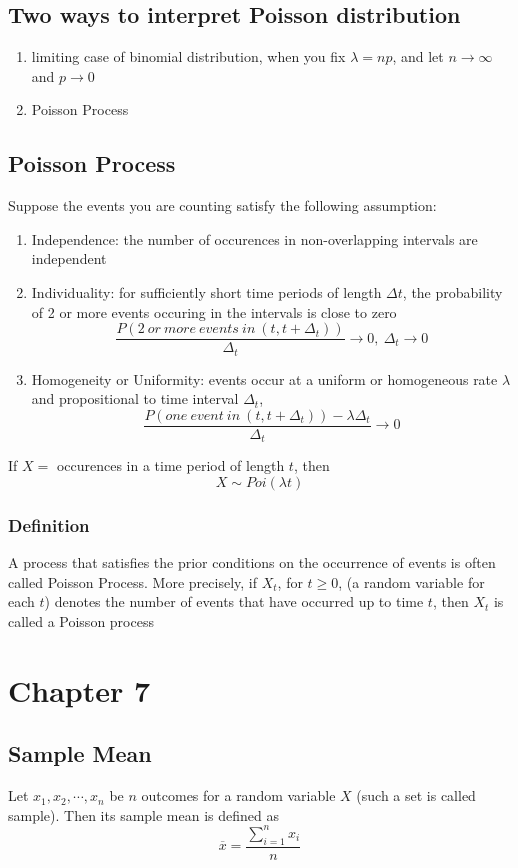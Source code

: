\documentclass[11pt]{article}
\begin{document}
\subsection{Two ways to interpret Poisson distribution}
\begin{enumerate}
    \item limiting case of binomial distribution, when you fix $\lambda=np$, and let $n\rightarrow\infty$ and $p\rightarrow 0$
    \item Poisson Process
\end{enumerate}
\subsection{Poisson Process}
Suppose the events you are counting satisfy the following assumption:
\begin{enumerate}
    \item Independence: the number of occurences in non-overlapping intervals are independent
    \item Individuality: for sufficiently short time periods of length $\Delta t$, the probability of 2 or more events occuring in the intervals is close to zero
    \[\dfrac{P(2\ or\ more\ events\ in\ (t, t+\Delta_t))}{\Delta_t}\rightarrow0,\ \Delta_t\rightarrow0\]
    \item Homogeneity or Uniformity: events occur at a uniform or homogeneous rate $\lambda$ and propositional to time interval $\Delta_t$, 
    \[\dfrac{P(one\ event\ in\ (t, t+\Delta_t)) - \lambda\Delta_t}{\Delta_t}\rightarrow0\]
\end{enumerate}
If $X = $ occurences in a time period of length $t$, then \[X\sim Poi(\lambda t)\]
\subsubsection{Definition}
A process that satisfies the prior conditions on the occurrence of events is often called Poisson Process. More precisely, if $X_t$, for $t\geq0$, (a random variable for each $t$) denotes the number of events that have occurred up to time $t$, then $X_t$ is called a Poisson process

\section{Chapter 7}
\subsection{Sample Mean}
Let $x_1, x_2,\cdots, x_n$ be $n$ outcomes for a random variable $X$ (such a set is called sample). Then its sample mean is defined as \[\overline{x} = \frac{\sum_{i=1}^{n}x_i}{n}\]
\end{document}
